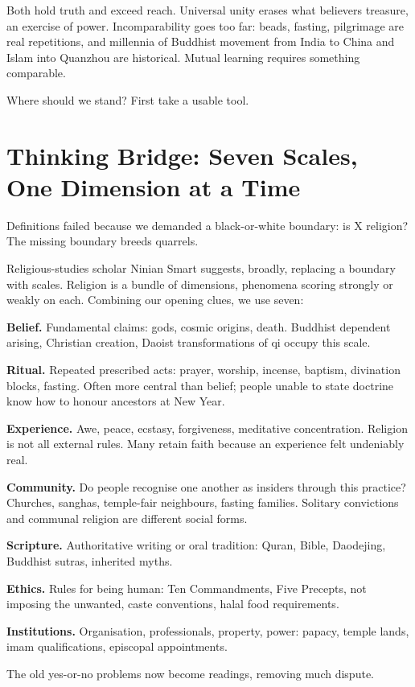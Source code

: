 Both hold truth and exceed reach. Universal unity erases what believers treasure, an exercise of power. Incomparability goes too far: beads, fasting, pilgrimage are real repetitions, and millennia of Buddhist movement from India to China and Islam into Quanzhou are historical. Mutual learning requires something comparable.

Where should we stand? First take a usable tool.

\section[Thinking Bridge: Seven Measuring Scales]{Thinking Bridge: Seven Scales, One Dimension at a Time}
Definitions failed because we demanded a black-or-white boundary: is X religion? The missing boundary breeds quarrels.

Religious-studies scholar Ninian Smart suggests, broadly, replacing a boundary with scales. Religion is a bundle of dimensions, phenomena scoring strongly or weakly on each. Combining our opening clues, we use seven:

\textbf{Belief.} Fundamental claims: gods, cosmic origins, death. Buddhist dependent arising, Christian creation, Daoist transformations of qi occupy this scale.

\textbf{Ritual.} Repeated prescribed acts: prayer, worship, incense, baptism, divination blocks, fasting. Often more central than belief; people unable to state doctrine know how to honour ancestors at New Year.

\textbf{Experience.} Awe, peace, ecstasy, forgiveness, meditative concentration. Religion is not all external rules. Many retain faith because an experience felt undeniably real.

\textbf{Community.} Do people recognise one another as insiders through this practice? Churches, sanghas, temple-fair neighbours, fasting families. Solitary convictions and communal religion are different social forms.

\textbf{Scripture.} Authoritative writing or oral tradition: Quran, Bible, Daodejing, Buddhist sutras, inherited myths.

\textbf{Ethics.} Rules for being human: Ten Commandments, Five Precepts, not imposing the unwanted, caste conventions, halal food requirements.

\textbf{Institutions.} Organisation, professionals, property, power: papacy, temple lands, imam qualifications, episcopal appointments.

The old yes-or-no problems now become readings, removing much dispute.

